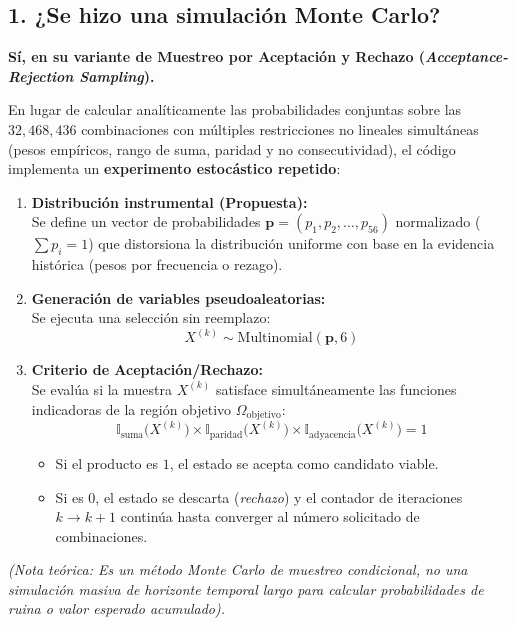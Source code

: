 \documentclass[11pt,a4paper]{article}
\begin{document}
\subsection*{1. ¿Se hizo una simulación Monte Carlo?}

\textbf{Sí, en su variante de Muestreo por Aceptación y Rechazo (\textit{Acceptance-Rejection Sampling}).}

En lugar de calcular analíticamente las probabilidades conjuntas sobre las $32,468,436$ combinaciones con múltiples restricciones no lineales simultáneas (pesos empíricos, rango de suma, paridad y no consecutividad), el código implementa un \textbf{experimento estocástico repetido}:

\begin{enumerate}
    \item \textbf{Distribución instrumental (Propuesta):} \\
    Se define un vector de probabilidades $\mathbf{p} = (p_1, p_2, \dots, p_{56})$ normalizado ($\sum p_i = 1$) que distorsiona la distribución uniforme con base en la evidencia histórica (pesos por frecuencia o rezago).
    
    \item \textbf{Generación de variables pseudoaleatorias:} \\
    Se ejecuta una selección sin reemplazo:
    $$X^{(k)} \sim \text{Multinomial}(\mathbf{p}, 6)$$
    
    \item \textbf{Criterio de Aceptación/Rechazo:} \\
    Se evalúa si la muestra $X^{(k)}$ satisface simultáneamente las funciones indicadoras de la región objetivo $\Omega_{\text{objetivo}}$:
    $$\mathbb{I}_{\text{suma}}\big(X^{(k)}\big) \times \mathbb{I}_{\text{paridad}}\big(X^{(k)}\big) \times \mathbb{I}_{\text{adyacencia}}\big(X^{(k)}\big) = 1$$
    \begin{itemize}
        \item Si el producto es $1$, el estado se acepta como candidato viable.
        \item Si es $0$, el estado se descarta (\textit{rechazo}) y el contador de iteraciones $k \to k+1$ continúa hasta converger al número solicitado de combinaciones.
    \end{itemize}
\end{enumerate}

\textit{(Nota teórica: Es un método Monte Carlo de muestreo condicional, no una simulación masiva de horizonte temporal largo para calcular probabilidades de ruina o valor esperado acumulado).}
\end{document}
